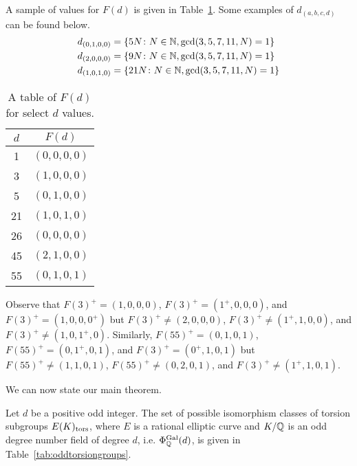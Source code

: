 \begin{ex}
A sample of values for $F(d)$ is given in Table~\ref{tab:fd}. Some examples of $d_{(a,b,c,d)}$ can be found below. 
	\[
	\begin{aligned}
	d_{(0,1,0,0)}&= \{ 5N \colon N \in \mathbb{N}, \gcd(3,5,7,11,N)= 1 \} \\
	d_{(2,0,0,0)}&=  \{ 9N \colon N \in \mathbb{N}, \gcd(3,5,7,11,N)= 1 \} \\
	d_{(1,0,1,0)}&=  \{ 21N \colon N \in \mathbb{N}, \gcd(3,5,7,11,N)= 1 \}
	\end{aligned}
	\]
	\begin{table}[!ht]
	\centering
	\caption{A table of $F(d)$ for select $d$ values.\label{tab:fd}}
	\begin{tabular}{cc} \hline
	$d$ & $F(d)$ \\ \hline 
	1 & $(0,0,0,0)$ \\
	3 & $(1,0,0,0)$ \\
	5 & $(0,1,0,0)$ \\
	21 & $(1,0,1,0)$ \\
	26 & $(0,0,0,0)$ \\
	45 & $(2,1,0,0)$ \\
	55 & $(0,1,0,1)$
	\end{tabular}
	\end{table}
Observe that $F(3)^+= (1,0,0,0)$, $F(3)^+= (1^+,0,0,0)$, and $F(3)^+= (1,0,0,0^+)$ but $F(3)^+ \neq (2,0,0,0)$, $F(3)^+ \neq (1^+,1,0,0)$, and $F(3)^+ \neq (1,0,1^+,0)$. Similarly, $F(55)^+= (0,1,0,1)$, $F(55)^+= (0,1^+,0,1)$, and $F(3)^+= (0^+,1,0,1)$ but $F(55)^+ \neq (1,1,0,1)$, $F(55)^+ \neq (0,2,0,1)$, and $F(3)^+ \neq (1^+,1,0,1)$.
\end{ex}


We can now state our main theorem. 


\begin{thm}
Let $d$ be a positive odd integer. The set of possible isomorphism classes of torsion subgroups $E(K)_{\text{tors}}$, where $E$ is a rational elliptic curve and $K/\mathbb{Q}$ is an odd degree number field of degree $d$, i.e. $\Phi_{\mathbb{Q}}^{\operatorname{Gal}}(d)$, is given in Table~\ref{tab:oddtorsiongroups}. 
 \end{thm}
 
